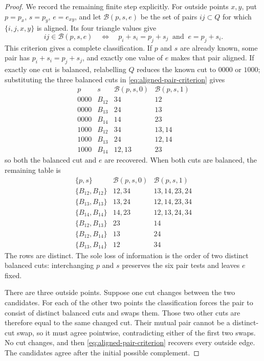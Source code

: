 \begin{proof}
We record the remaining finite step explicitly.  For outside points \(x,y\),
put \(p=p_x\), \(s=p_y\), \(e=e_{xy}\), and let
\(\mathcal B(p,s,e)\) be the set of pairs \(ij\subset Q\) for which
\(\{i,j,x,y\}\) is aligned.  Its four triangle values give
\begin{equation}
 \label{eq:aligned-pair-criterion}
 ij\in\mathcal B(p,s,e)
 \quad\Longleftrightarrow\quad
 p_i+s_i=p_j+s_j\ \text{ and }\ e=p_j+s_i.
\end{equation}
This criterion gives a complete classification.  If \(p\) and \(s\) are
already known, some pair has \(p_i+s_i=p_j+s_j\), and exactly one value of
\(e\) makes that pair aligned.  If exactly one cut is balanced, relabelling
\(Q\) reduces the known cut to \(0000\) or \(1000\); substituting the three
balanced cuts in \eqref{eq:aligned-pair-criterion} gives
\[
\begin{array}{c|c|c|c}
p&s&\mathcal B(p,s,0)&\mathcal B(p,s,1)\\ \hline
0000&B_{12}&34&12\\
0000&B_{13}&24&13\\
0000&B_{14}&14&23\\
1000&B_{12}&34&13,14\\
1000&B_{13}&24&12,14\\
1000&B_{14}&12,13&23
\end{array}
\]
so both the balanced cut and \(e\) are recovered.  When both cuts are
balanced, the remaining table is
\[
\begin{array}{c|c|c}
\{p,s\}&\mathcal B(p,s,0)&\mathcal B(p,s,1)\\ \hline
\{B_{12},B_{12}\}&12,34&13,14,23,24\\
\{B_{13},B_{13}\}&13,24&12,14,23,34\\
\{B_{14},B_{14}\}&14,23&12,13,24,34\\
\{B_{12},B_{13}\}&23&14\\
\{B_{12},B_{14}\}&13&24\\
\{B_{13},B_{14}\}&12&34
\end{array}
\]
The rows are distinct.  The sole loss of information is the order of two
distinct balanced cuts: interchanging \(p\) and \(s\) preserves the six pair
tests and leaves \(e\) fixed.

There are three outside points.  Suppose one cut changes between the two
candidates.  For each of the other two points the classification forces the
pair to consist of distinct balanced cuts and swaps them.  Those two other
cuts are therefore equal to the same changed cut.  Their mutual pair cannot
be a distinct-cut swap, so it must agree pointwise, contradicting either of
the first two swaps.  No cut changes, and then
\eqref{eq:aligned-pair-criterion} recovers every outside
edge.  The candidates agree after the initial possible complement.


\end{proof}
